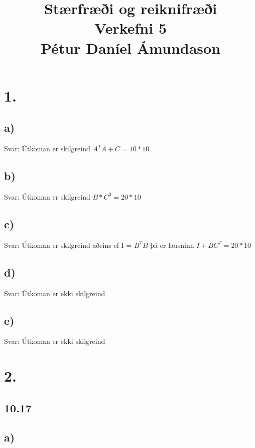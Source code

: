 \documentclass[]{article}
\begin{document}
	\title{Stærfræði og reiknifræði\\
		Verkefni 5\\
		Pétur Daníel Ámundason\\
	}
	\maketitle
	
	\section*{1.}
	
	\subsection*{a)}
	Svar: Útkoman er skilgreind $ A^{T}A + C = 10 * 10$
	
	\subsection*{b)}
	
	Svar: Útkoman er skilgreind $B*C^{3} = 20 * 10$
	
	\subsection*{c)}
	
	Svar: Útkoman er skilgreind aðeins ef I = $ B^{T}B $ þá er lausninn $I + BC^{T} = 20*10$
	
	\subsection*{d)}
	
	Svar: Útkoman er ekki skilgreind
	
	\subsection*{e)}
	
	Svar: Útkoman er ekki skilgreind
	
	\section*{2.}
	
	\subsection*{10.17}
	
	\subsection*{a)}
	
\end{document}
